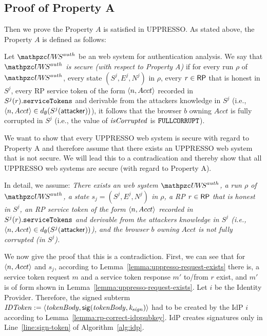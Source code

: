 \begin{theorem}
  \subsection{Proof of Property A}
  Then we prove the Property $A$ is satisfied in UPPRESSO.
  As stated above, the Property $A$ is defined as follows:
  \begin{definition}\label{def:uppresso-security-property} 
    Let $\uppressoauthwebsystem$ be an \uppresso web system 
    for authentication analysis. We say that 
    \emph{$\uppressoauthwebsystem$ is secure 
    (with respect to Property A)} if for every run $\rho$ of 
    $\uppressoauthwebsystem$, every state $(S^j, E^j, N^j)$ in 
    $\rho$, every $r\in \mathsf{RP}$ that is honest in $S^j$, 
    every RP service token of the form $\langle {{}n, Acct} \rangle$ 
    recorded in $S^j(r).\mathtt{serviceTokens}$ and derivable 
    from the attackers knowledge in $S^j$ (i.e., 
    $\langle {{}n, Acct} \rangle \in 
    d_{\emptyset}(S^j(\mathsf{attacker}))$), it follows that the 
    browser $b$ owning $Acct$ is fully corrupted in $S^j$ 
    (i.e., the value of $\mathit{isCorrupted}$ is $\mathtt{FULLCORRUPT}$). 
  \end{definition}
  

  
  We want to show that every UPPRESSO web system is secure with regard to Property A and therefore assume that there exists an UPPRESSO web system that is not secure. We will lead this to a contradication and thereby show that all UPPRESSO web systems are secure (with regard to Property A).

  
  In detail, we assume: \emph{There exists an \uppresso web 
  system $\uppressoauthwebsystem$, a run $\rho$ of 
  $\uppressoauthwebsystem$, a state $s_j = (S^j, E^j, N^j)$ 
  in $\rho$, a RP $r\in \mathsf{RP}$ that is honest in $S^j$, 
  an RP service token of the form $\langle {{}n, Acct} \rangle$
  recorded in $S^j(r).\mathtt{serviceTokens}$ and derivable from 
  the attackers knowledge in $S^j$ (i.e., $\langle {{}n, Acct} \rangle \in
  d_{\emptyset}(S^j(\mathsf{attacker}))$), and the browser $b$ 
  owning $Acct$ is not fully corrupted (in $S^j$).}
  
  We now give the proof that this is a contradiction. First, we can see that for $\langle n, Acct\rangle$ and $s_j$, according to Lemma~\ref{lemma:uppresso-request-exists} there is, a service token request $m$ and a service token response $m'$ to/from $r$ exist, and $m'$ is of form shown in Lemma~\ref{lemma:uppresso-request-exists}. Let $i$ be the Identity Provider. Therefore, the signed subterm $\mathit{IDToken} := \langle {{}\mathit{tokenBody}, \mathit{\mathsf{sig}(tokenBody, k_{sign})}} \rangle$ had to be created by the IdP $i$ according to Lemma~\ref{lemma:rp-correct-idppubkey}. IdP creates signatures only in Line~\ref{line:sign-token} of Algorithm~\ref{alg:idp}.
  

\end{theorem}

